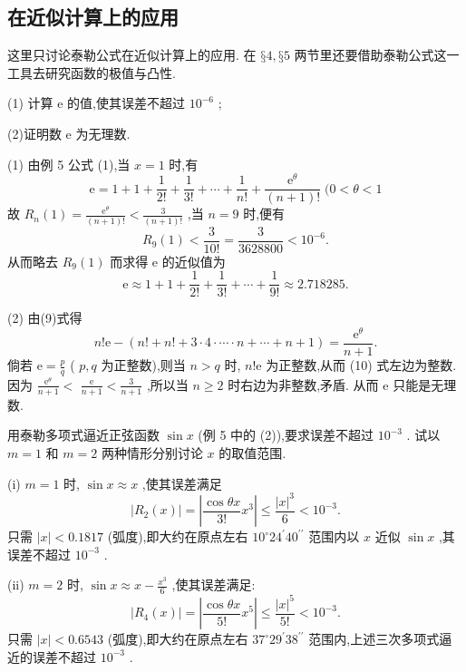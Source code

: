 \subsection{在近似计算上的应用}

这里只讨论泰勒公式在近似计算上的应用. 在 \(§4,§5\) 两节里还要借助泰勒公式这一工具去研究函数的极值与凸性.

\begin{example}
(1) 计算 \(\mathrm{e}\) 的值,使其误差不超过 \({10}^{-6}\) ;

(2)证明数 e 为无理数.
\end{example}


\begin{solution}
(1) 由例 5 公式 (1),当 \(x = 1\) 时,有
\[
\mathrm{e} = 1 + 1 + \frac{1}{2!} + \frac{1}{3!} + \cdots  + \frac{1}{n!} + \frac{{\mathrm{e}}^{\theta }}{\left( {n + 1}\right) !}\;(0 < \theta  < 1 \tag{9}
\]
故 \({R}_{n}\left( 1\right)  = \frac{{\mathrm{e}}^{\theta }}{\left( {n + 1}\right) !} < \frac{3}{\left( {n + 1}\right) !}\) ,当 \(n = 9\) 时,便有
\[
{R}_{9}\left( 1\right)  < \frac{3}{{10}!} = \frac{3}{3628800} < {10}^{-6}.
\]
从而略去 \({R}_{9}\left( 1\right)\) 而求得 \(\mathrm{e}\) 的近似值为
\[
\mathrm{e} \approx  1 + 1 + \frac{1}{2!} + \frac{1}{3!} + \cdots  + \frac{1}{9!} \approx  {2.718285}.
\]

(2) 由(9)式得
\[
n!\mathrm{e} - \left( {n! + n! + 3 \cdot  4 \cdot  \cdots  \cdot  n + \cdots  + n + 1}\right)  = \frac{{\mathrm{e}}^{\theta }}{n + 1}. \tag{10}
\]
倘若 \(\mathrm{e} = \frac{p}{q}\) ( \(p,q\) 为正整数),则当 \(n > q\) 时, \(n!\mathrm{e}\) 为正整数,从而 (10) 式左边为整数. 因为 \(\frac{{\mathrm{e}}^{\theta }}{n + 1} <\)  \(\frac{\mathrm{e}}{n + 1} < \frac{3}{n + 1}\) ,所以当 \(n \geq  2\) 时右边为非整数,矛盾. 从而 \(\mathrm{e}\) 只能是无理数.

\end{solution}

\begin{example}
用泰勒多项式逼近正弦函数 \(\sin x\) (例 5 中的 (2)),要求误差不超过 \({10}^{-3}\) . 试以 \(m = 1\) 和 \(m = 2\) 两种情形分别讨论 \(x\) 的取值范围.

(i) \(m = 1\) 时, \(\sin x \approx  x\) ,使其误差满足
\[
\left| {{R}_{2}\left( x\right) }\right|  = \left| {\frac{\cos {\theta x}}{3!}{x}^{3}}\right|  \leq  \frac{{\left| x\right| }^{3}}{6} < {10}^{-3}.
\]
只需 \(\left| x\right|  < {0.1817}\) (弧度),即大约在原点左右 \({10}^{ \circ  }{24}^{\prime }{40}^{\prime \prime }\) 范围内以 \(x\) 近似 \(\sin x\) ,其误差不超过 \({10}^{-3}\) .

(ii) \(m = 2\) 时, \(\sin x \approx  x - \frac{{x}^{3}}{6}\) ,使其误差满足:
\[
\left| {{R}_{4}\left( x\right) }\right|  = \left| {\frac{\cos {\theta x}}{5!}{x}^{5}}\right|  \leq  \frac{{\left| x\right| }^{5}}{5!} < {10}^{-3}.
\]
只需 \(\left| x\right|  < {0.6543}\) (弧度),即大约在原点左右 \({37}^{ \circ  }{29}^{\prime }{38}^{\prime \prime }\) 范围内,上述三次多项式逼近的误差不超过 \({10}^{-3}\) .
\end{example}

